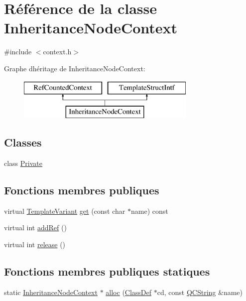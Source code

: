 \hypertarget{class_inheritance_node_context}{}\section{Référence de la classe Inheritance\+Node\+Context}
\label{class_inheritance_node_context}


{\ttfamily \#include $<$context.\+h$>$}

Graphe d\textquotesingle{}héritage de Inheritance\+Node\+Context\+:\begin{figure}[H]
\begin{center}
\leavevmode
\includegraphics[height=2.000000cm]{class_inheritance_node_context}
\end{center}
\end{figure}
\subsection*{Classes}
\begin{DoxyCompactItemize}
\item 
class \hyperlink{class_inheritance_node_context_1_1_private}{Private}
\end{DoxyCompactItemize}
\subsection*{Fonctions membres publiques}
\begin{DoxyCompactItemize}
\item 
virtual \hyperlink{class_template_variant}{Template\+Variant} \hyperlink{class_inheritance_node_context_a3f5113eb0ea49fbc54955de6ddcce60a}{get} (const char $\ast$name) const 
\item 
virtual int \hyperlink{class_inheritance_node_context_a5184d5ea8a197cb2de5cf66b3c0a9e88}{add\+Ref} ()
\item 
virtual int \hyperlink{class_inheritance_node_context_a37fa7b0204b7762070d886d5c1655b8f}{release} ()
\end{DoxyCompactItemize}
\subsection*{Fonctions membres publiques statiques}
\begin{DoxyCompactItemize}
\item 
static \hyperlink{class_inheritance_node_context}{Inheritance\+Node\+Context} $\ast$ \hyperlink{class_inheritance_node_context_ade7b2ccc73e861ded7afbc823d30d9f5}{alloc} (\hyperlink{class_class_def}{Class\+Def} $\ast$cd, const \hyperlink{class_q_c_string}{Q\+C\+String} \&name)
\end{DoxyCompactItemize}


